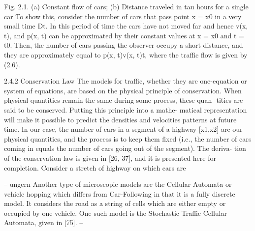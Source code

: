 Fig. 2.1. (a) Constant flow of cars; (b) Distance traveled in tau hours for a single car
To show this, consider the number of cars that pass point x = x0 in a very small time Dt. In this period of time the cars have not moved far and hence v(x, t), and p(x, t) can be approximated by their constant values at x = x0 and t = t0. Then, the number of cars passing the observer occupy a short distance, and they are approximately equal to p(x, t)v(x, t)t, where the traffic flow is given by (2.6).

2.4.2 Conservation Law
The models for traffic, whether they are one-equation or system of equations, are based on the physical principle of conservation. When physical quantities remain the same during some process, these quan- tities are said to be conserved. Putting this principle into a mathe- matical representation will make it possible to predict the densities and velocities patterns at future time. In our case, the number of cars in a segment of a highway [x1,x2] are our physical quantities, and the process is to keep them fixed (i.e., the number of cars coming in equals the number of cars going out of the segment). The deriva- tion of the conservation law is given in [26, 37], and it is presented here for completion. Consider a stretch of highway on which cars are





-- ungern
Another type of microscopic models are the Cellular Automata or vehicle hopping which differs from Car-Following in that it is a fully discrete model. It considers the road as a string of cells which are either empty or occupied by one vehicle. One such model is the Stochastic Traffic Cellular Automata, given in [75].
--